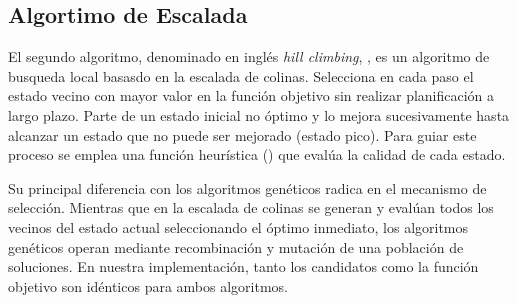 

\subsection{Algortimo de Escalada}
\label{alg:approachHC}

El segundo algoritmo, denominado en inglés \textit{hill climbing},  \cite{Russell:2009, Cormen2009, kleinberg2006}, es un algoritmo de busqueda local basasdo en la escalada de colinas.
Selecciona en cada paso el estado vecino con mayor valor en la función objetivo sin realizar planificación a largo plazo.
Parte de un estado inicial no óptimo y lo mejora sucesivamente hasta alcanzar un estado que no puede ser mejorado (estado pico). 
Para guiar este proceso se emplea una función heurística () que evalúa la calidad de cada estado.

Su principal diferencia con los algoritmos genéticos radica en el mecanismo de selección. Mientras que en la escalada de colinas se generan y evalúan todos los vecinos del estado actual seleccionando el óptimo inmediato, 
los algoritmos genéticos operan mediante recombinación y mutación de una población de soluciones. 
En nuestra implementación, tanto los candidatos como la función objetivo son idénticos para ambos algoritmos.

